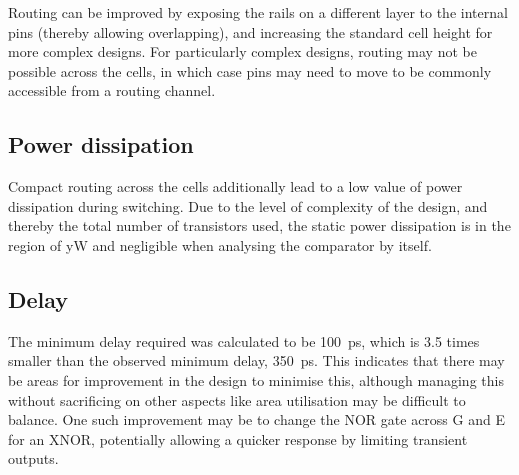 Routing can be improved by exposing the rails on a different layer to the internal pins (thereby 
allowing overlapping), and increasing the standard cell height for more complex designs. For particularly 
complex designs, routing may not be possible across the cells, in which case pins may need to move 
to be commonly accessible from a routing channel.

\subsection{Power dissipation}
Compact routing across the cells additionally lead to a low value of power dissipation during 
switching. Due to the level of complexity of the design, and thereby the total number of transistors used,
the static power dissipation is in the region of yW and negligible when analysing the comparator by itself.  

\subsection{Delay}
The minimum delay required was calculated to be \qty{100}{\ps}, which is 3.5 times smaller 
than the observed minimum delay, \qty{350}{\ps}. This indicates that there may be areas for 
improvement in the design to minimise this, although managing this without sacrificing on 
other aspects like area utilisation may be difficult to balance. 
One such improvement may be to change the NOR gate across G and E for an XNOR, potentially allowing 
a quicker response by limiting transient outputs. 



